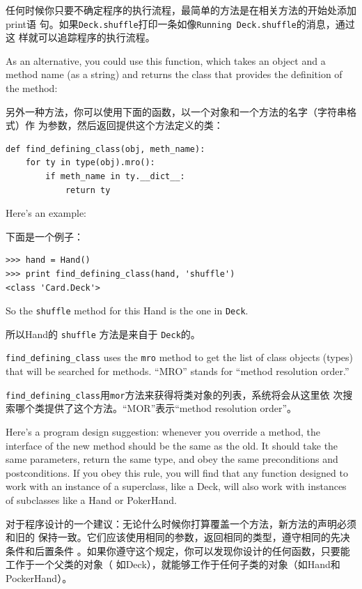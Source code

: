\documentclass[10pt]{book}
\begin{document}
\begin{CJK}{UTF8}{gbsn}
任何时候你只要不确定程序的执行流程，最简单的方法是在相关方法的开始处添加print语
句。如果{\tt Deck.shuffle}打印一条如像{\tt Running Deck.shuffle}的消息，通过这
样就可以追踪程序的执行流程。

As an alternative, you could use this function, which takes an
object and a method name (as a string) and returns the class that
provides the definition of the method:

另外一种方法，你可以使用下面的函数，以一个对象和一个方法的名字（字符串格式）作
为参数，然后返回提供这个方法定义的类：

\begin{verbatim}
def find_defining_class(obj, meth_name):
    for ty in type(obj).mro():
        if meth_name in ty.__dict__:
            return ty
\end{verbatim}
%
Here's an example:

下面是一个例子：

\begin{verbatim}
>>> hand = Hand()
>>> print find_defining_class(hand, 'shuffle')
<class 'Card.Deck'>
\end{verbatim}
%
So the {\tt shuffle} method for this Hand is the one in {\tt Deck}.

所以Hand的 {\tt shuffle} 方法是来自于 {\tt Deck}的。

\verb"find_defining_class" uses the {\tt mro} method to get the list
of class objects (types) that will be searched for methods.  ``MRO''
stands for ``method resolution order.''

\verb"find_defining_class"用{\tt mor}方法来获得将类对象的列表，系统将会从这里依
次搜索哪个类提供了这个方法。``MOR''表示``method resolution order''。

Here's a program design suggestion: whenever you override a method,
the interface of the new method should be the same as the old.  It
should take the same parameters, return the same type, and obey the
same preconditions and postconditions.  If you obey this rule, you
will find that any function designed to work with an instance of a
superclass, like a Deck, will also work with instances of subclasses
like a Hand or PokerHand.

对于程序设计的一个建议：无论什么时候你打算覆盖一个方法，新方法的声明必须和旧的
保持一致。它们应该使用相同的参数，返回相同的类型，遵守相同的先决条件和后置条件
。如果你遵守这个规定，你可以发现你设计的任何函数，只要能工作于一个父类的对象（
如Deck），就能够工作于任何子类的对象（如Hand和PockerHand）。


\end{CJK}
\end{document}
